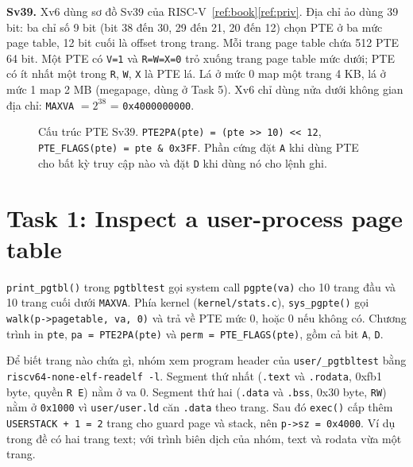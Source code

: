 \documentclass[10pt,a4paper]{article}
\newcommand{\cc}[1]{\texttt{#1}}
\begin{document}
\textbf{Sv39.} Xv6 dùng sơ đồ Sv39 của RISC-V~\ref{ref:book}\ref{ref:priv}. Địa chỉ ảo dùng 39 bit: ba chỉ số 9 bit (bit 38 đến 30, 29 đến 21, 20 đến 12) chọn PTE ở ba mức page table, 12 bit cuối là offset trong trang. Mỗi trang page table chứa 512 PTE 64 bit. Một PTE có \cc{V=1} và \cc{R=W=X=0} trỏ xuống trang page table mức dưới; PTE có ít nhất một trong \cc{R}, \cc{W}, \cc{X} là PTE lá. Lá ở mức 0 map một trang 4 KB, lá ở mức 1 map 2 MB (megapage, dùng ở Task 5). Xv6 chỉ dùng nửa dưới không gian địa chỉ: \cc{MAXVA} $= 2^{38}$ = \cc{0x4000000000}.

\begin{figure}[H]
\centering
{}
\caption{Cấu trúc PTE Sv39. \cc{PTE2PA(pte) = (pte >> 10) << 12}, \cc{PTE\_FLAGS(pte) = pte \& 0x3FF}. Phần cứng đặt \cc{A} khi dùng PTE cho bất kỳ truy cập nào và đặt \cc{D} khi dùng nó cho lệnh ghi.}\label{fig:pte}
\end{figure}

\section{Task 1: Inspect a user-process page table}\label{sec:task1}

\cc{print\_pgtbl()} trong \cc{pgtbltest} gọi system call \cc{pgpte(va)} cho 10 trang đầu và 10 trang cuối dưới \cc{MAXVA}. Phía kernel (\cc{kernel/stats.c}), \cc{sys\_pgpte()} gọi \cc{walk(p->pagetable, va, 0)} và trả về PTE mức 0, hoặc 0 nếu không có. Chương trình in \cc{pte}, \cc{pa = PTE2PA(pte)} và \cc{perm = PTE\_FLAGS(pte)}, gồm cả bit \cc{A}, \cc{D}.

Để biết trang nào chứa gì, nhóm xem program header của \cc{user/\_pgtbltest} bằng \cc{riscv64-none-elf-readelf -l}. Segment thứ nhất (\cc{.text} và \cc{.rodata}, 0xfb1 byte, quyền \cc{R E}) nằm ở va 0. Segment thứ hai (\cc{.data} và \cc{.bss}, 0x30 byte, \cc{RW}) nằm ở \cc{0x1000} vì \cc{user/user.ld} căn \cc{.data} theo trang. Sau đó \cc{exec()} cấp thêm \cc{USERSTACK + 1 = 2} trang cho guard page và stack, nên \cc{p->sz = 0x4000}. Ví dụ trong đề có hai trang text; với trình biên dịch của nhóm, text và rodata vừa một trang.
\end{document}
